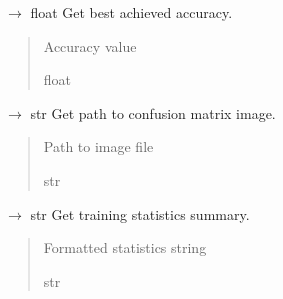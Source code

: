 \documentclass[letterpaper,10pt,english]{sphinxmanual}
\begin{document}

\begin{fulllineitems}
\label{\detokenize{autoapi/src/CNNTrainer/index:src.CNNTrainer.get_best_acc}}
\pysigstartsignatures
\pysiglinewithargsret
{}
{}
{{ $\rightarrow$ float}}
\pysigstopsignatures
\sphinxAtStartPar
Get best achieved accuracy.
\begin{quote}\begin{description}
\sphinxAtStartPar
Accuracy value

\sphinxAtStartPar
float

\end{description}\end{quote}

\end{fulllineitems}


\begin{fulllineitems}
\label{\detokenize{autoapi/src/CNNTrainer/index:src.CNNTrainer.get_confusion_matrix}}
\pysigstartsignatures
\pysiglinewithargsret
{}
{}
{{ $\rightarrow$ str}}
\pysigstopsignatures
\sphinxAtStartPar
Get path to confusion matrix image.
\begin{quote}\begin{description}
\sphinxAtStartPar
Path to image file

\sphinxAtStartPar
str

\end{description}\end{quote}

\end{fulllineitems}


\begin{fulllineitems}
\label{\detokenize{autoapi/src/CNNTrainer/index:src.CNNTrainer.stats}}
\pysigstartsignatures
\pysiglinewithargsret
{}
{}
{{ $\rightarrow$ str}}
\pysigstopsignatures
\sphinxAtStartPar
Get training statistics summary.
\begin{quote}\begin{description}
\sphinxAtStartPar
Formatted statistics string

\sphinxAtStartPar
str

\end{description}\end{quote}

\end{fulllineitems}
\end{document}
